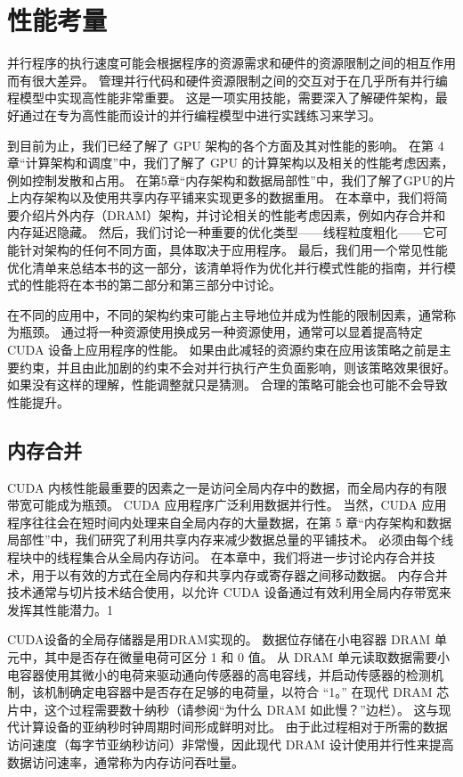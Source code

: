 \section{性能考量}
并行程序的执行速度可能会根据程序的资源需求和硬件的资源限制之间的相互作用而有很大差异。 管理并行代码和硬件资源限制之间的交互对于在几乎所有并行编程模型中实现高性能非常重要。 这是一项实用技能，需要深入了解硬件架构，最好通过在专为高性能而设计的并行编程模型中进行实践练习来学习。

到目前为止，我们已经了解了 GPU 架构的各个方面及其对性能的影响。 在第 4 章“计算架构和调度”中，我们了解了 GPU 的计算架构以及相关的性能考虑因素，例如控制发散和占用。 在第5章“内存架构和数据局部性”中，我们了解了GPU的片上内存架构以及使用共享内存平铺来实现更多的数据重用。 在本章中，我们将简要介绍片外内存（DRAM）架构，并讨论相关的性能考虑因素，例如内存合并和内存延迟隐藏。 然后，我们讨论一种重要的优化类型——线程粒度粗化——它可能针对架构的任何不同方面，具体取决于应用程序。 最后，我们用一个常见性能优化清单来总结本书的这一部分，该清单将作为优化并行模式性能的指南，并行模式的性能将在本书的第二部分和第三部分中讨论。

在不同的应用中，不同的架构约束可能占主导地位并成为性能的限制因素，通常称为瓶颈。 通过将一种资源使用换成另一种资源使用，通常可以显着提高特定 CUDA 设备上应用程序的性能。 如果由此减轻的资源约束在应用该策略之前是主要约束，并且由此加剧的约束不会对并行执行产生负面影响，则该策略效果很好。 如果没有这样的理解，性能调整就只是猜测。 合理的策略可能会也可能不会导致性能提升。

\subsection{内存合并}
CUDA 内核性能最重要的因素之一是访问全局内存中的数据，而全局内存的有限带宽可能成为瓶颈。 CUDA 应用程序广泛利用数据并行性。 当然，CUDA 应用程序往往会在短时间内处理来自全局内存的大量数据，在第 5 章“内存架构和数据局部性”中，我们研究了利用共享内存来减少数据总量的平铺技术。 必须由每个线程块中的线程集合从全局内存访问。 在本章中，我们将进一步讨论内存合并技术，用于以有效的方式在全局内存和共享内存或寄存器之间移动数据。 内存合并技术通常与切片技术结合使用，以允许 CUDA 设备通过有效利用全局内存带宽来发挥其性能潜力。1

CUDA设备的全局存储器是用DRAM实现的。 数据位存储在小电容器 DRAM 单元中，其中是否存在微量电荷可区分 1 和 0 值。 从 DRAM 单元读取数据需要小电容器使用其微小的电荷来驱动通向传感器的高电容线，并启动传感器的检测机制，该机制确定电容器中是否存在足够的电荷量，以符合 “1。” 在现代 DRAM 芯片中，这个过程需要数十纳秒（请参阅“为什么 DRAM 如此慢？”边栏）。 这与现代计算设备的亚纳秒时钟周期时间形成鲜明对比。 由于此过程相对于所需的数据访问速度（每字节亚纳秒访问）非常慢，因此现代 DRAM 设计使用并行性来提高数据访问速率，通常称为内存访问吞吐量。

